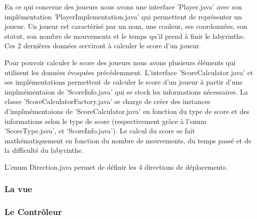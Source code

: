 En ce qui concerne des joueurs nous avons une interface 'Player.java' avec son implémentation 'PlayerImplementation.java' qui permettent de représenter un joueur. Un joueur est caractérisé par un nom, une couleur, ses coordonnées, son statut, son nombre de mouvements et le temps qu'il prend à finir le labyrinthe. Ces 2 dernières données serviront à calculer le score d'un joueur.

Pour pouvoir calculer le score des joueurs nous avons plusieurs éléments qui utilisent les données évoquées précédemment. L'interface 'ScoreCalculator.java' et ses implémentations permettent de calculer le score d'un joueur à partir d'une implmémentaion de 'ScoreInfo.java' qui se stock les informations nécessaires. La classe 'ScoreCalculatorFactory.java' se charge de créer des instances d'implmémentaions de 'ScoreCalculator.java' en fonction du type de score et des informations selon le type de score (respectivement grâce à l'enum 'ScoreType.java', et `ScoreInfo.java'). Le calcul du score se fait mathématiquement en fonction du nombre de mouvements, du temps passé et de la difficulté du labyrinthe.

L'enum Direction.java permet de définir les 4 directions de déplacements.

\subsubsection{La vue}

\subsubsection{Le Contrôleur}







